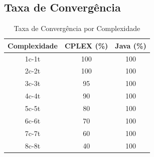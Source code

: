 \documentclass[12pt,a4paper]{article}
\begin{document}
\subsection{Taxa de Convergência}

\begin{table}[H]
\centering
\caption{Taxa de Convergência por Complexidade}
\begin{tabular}{|c|c|c|}
\hline
\textbf{Complexidade} & \textbf{CPLEX (\%)} & \textbf{Java (\%)} \\
\hline
1c-1t & 100 & 100 \\
2c-2t & 100 & 100 \\
3c-3t & 95 & 100 \\
4c-4t & 90 & 100 \\
5c-5t & 80 & 100 \\
6c-6t & 70 & 100 \\
7c-7t & 60 & 100 \\
8c-8t & 40 & 100 \\
\hline
\end{tabular}
\end{table}
\end{document}
